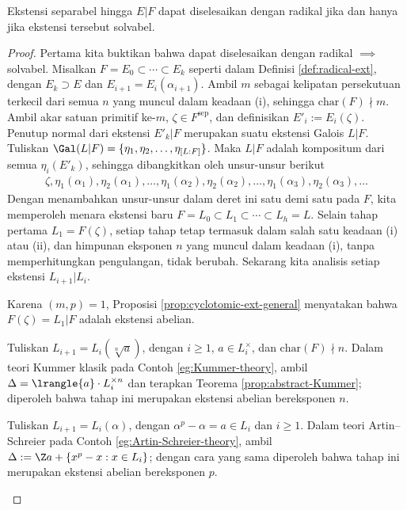 \begin{theorem}[É.\ Galois]\label{prop:characterization-solvable-radicals}
	Ekstensi separabel hingga $E|F$ dapat diselesaikan dengan radikal jika dan hanya jika ekstensi tersebut solvabel.
\end{theorem}
\begin{proof}
	Pertama kita buktikan bahwa dapat diselesaikan dengan radikal $\implies$ solvabel. Misalkan $F = E_0 \subset \cdots \subset E_k$ seperti dalam Definisi \ref{def:radical-ext}, dengan $E_k \supset  E$ dan $E_{i+1} = E_i(\alpha_{i+1})$. Ambil $m$ sebagai kelipatan persekutuan terkecil dari semua $n$ yang muncul dalam keadaan (i), sehingga $\text{char}(F) \nmid m$. Ambil akar satuan primitif ke-$m$, $\zeta \in F^\text{sep}$, dan definisikan $E'_i := E_i(\zeta)$. Penutup normal dari ekstensi $E'_k|F$ merupakan suatu ekstensi Galois $L|F$. Tuliskan $\Gal(L|F) = \{ \eta_1, \eta_2, \ldots, \eta_{[L:F]} \}$. Maka $L|F$ adalah kompositum dari semua $\eta_i(E'_k)$, sehingga dibangkitkan oleh unsur-unsur berikut
	\begin{gather*}
		\zeta, \eta_1(\alpha_1), \eta_2(\alpha_1), \ldots, \eta_1(\alpha_2), \eta_2(\alpha_2), \ldots, \eta_1(\alpha_3), \eta_2(\alpha_3), \ldots
	\end{gather*}
	Dengan menambahkan unsur-unsur dalam deret ini satu demi satu pada $F$, kita memperoleh menara ekstensi baru $F = L_0 \subset L_1 \subset \cdots \subset L_h = L$. Selain tahap pertama $L_1 = F(\zeta)$, setiap tahap tetap termasuk dalam salah satu keadaan (i) atau (ii), dan himpunan eksponen $n$ yang muncul dalam keadaan (i), tanpa memperhitungkan pengulangan, tidak berubah. Sekarang kita analisis setiap ekstensi $L_{i+1}|L_i$.
	\begin{compactdesc}
		\item[$i=0$: tahap pertama] Karena $(m,p)=1$, Proposisi \ref{prop:cyclotomic-ext-general} menyatakan bahwa $F(\zeta)=L_1|F$ adalah ekstensi abelian.
		\item[$i \geq 1$: keadaan (i)] Tuliskan $L_{i+1} = L_i(\sqrt[n]{a})$, dengan $i \geq 1$, $a \in L_i^\times$, dan $\text{char}(F) \nmid n$. Dalam teori Kummer klasik pada Contoh \ref{eg:Kummer-theory}, ambil $\Delta = \lrangle{a} \cdot L_i^{\times n}$ dan terapkan Teorema \ref{prop:abstract-Kummer}; diperoleh bahwa tahap ini merupakan ekstensi abelian bereksponen $n$.
		\item[$i \geq 1$: keadaan (ii)] Tuliskan $L_{i+1} = L_i(\alpha)$, dengan $\alpha^p - \alpha = a \in L_i$ dan $i \geq 1$. Dalam teori Artin--Schreier pada Contoh \ref{eg:Artin-Schreier-theory}, ambil $\Delta := \Z a + \{x^p-x : x \in L_i\}$; dengan cara yang sama diperoleh bahwa tahap ini merupakan ekstensi abelian bereksponen $p$.

\end{compactdesc}
\end{proof}
